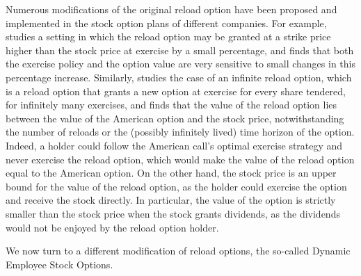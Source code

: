     Numerous modifications of the original reload option have been proposed and implemented in the stock option plans of different companies. For example, \cite{belanger2008infinite} studies a setting in which the reload option may be granted at a strike price higher than the stock price at exercise by a small percentage, and finds that both the exercise policy and the option value are very sensitive to small changes in this percentage increase. Similarly, \cite{dybvig2003employee} studies the case of an infinite reload option, which is a reload option that grants a new option at exercise for every share tendered, for infinitely many exercises, and finds that the value of the reload option lies between the value of the American option and the stock price, notwithstanding the number of reloads or the (possibly infinitely lived) time horizon of the option. Indeed, a holder could follow the American call's optimal exercise strategy and never exercise the reload option, which would make the value of the reload option equal to the American option. On the other hand, the stock price is an upper bound for the value of the reload option, as the holder could exercise the option and receive the stock directly. In particular, the value of the option is strictly smaller than the stock price when the stock grants dividends, as the dividends would not be enjoyed by the reload option holder. 
    
    We now turn to a different modification of reload options, the so-called Dynamic Employee Stock Options.

